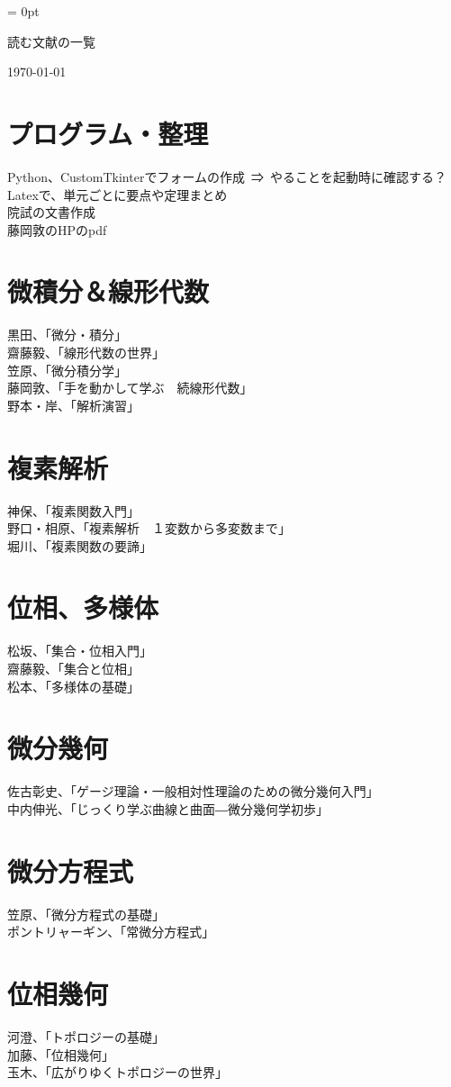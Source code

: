 \documentclass{jsarticle}
\begin{document}
\parindent = 0pt
\begin{center}
{\LARGE 読む文献の一覧} 
\end{center}
\begin{flushright}
\today
\end{flushright}
\section{プログラム・整理}
Python、CustomTkinterでフォームの作成\ ⇒\ やることを起動時に確認する？\\
Latexで、単元ごとに要点や定理まとめ\\
院試の文書作成\\
藤岡敦のHPのpdf
\section{微積分＆線形代数}
黒田、「微分・積分」\\
齋藤毅、「線形代数の世界」\\
笠原、「微分積分学」\\
藤岡敦、「手を動かして学ぶ　続線形代数」\\
野本・岸、「解析演習」
\section{複素解析}
神保、「複素関数入門」\\
野口・相原、「複素解析　１変数から多変数まで」\\
堀川、「複素関数の要諦」
\section{位相、多様体}
松坂、「集合・位相入門」\\
齋藤毅、「集合と位相」\\
松本、「多様体の基礎」
\section{微分幾何}
佐古彰史、「ゲージ理論・一般相対性理論のための微分幾何入門」\\
中内伸光、「じっくり学ぶ曲線と曲面―微分幾何学初歩」
\section{微分方程式}
笠原、「微分方程式の基礎」\\
ポントリャーギン、「常微分方程式」
\section{位相幾何}
河澄、「トポロジーの基礎」\\
加藤、「位相幾何」\\
玉木、「広がりゆくトポロジーの世界」
\end{document}
